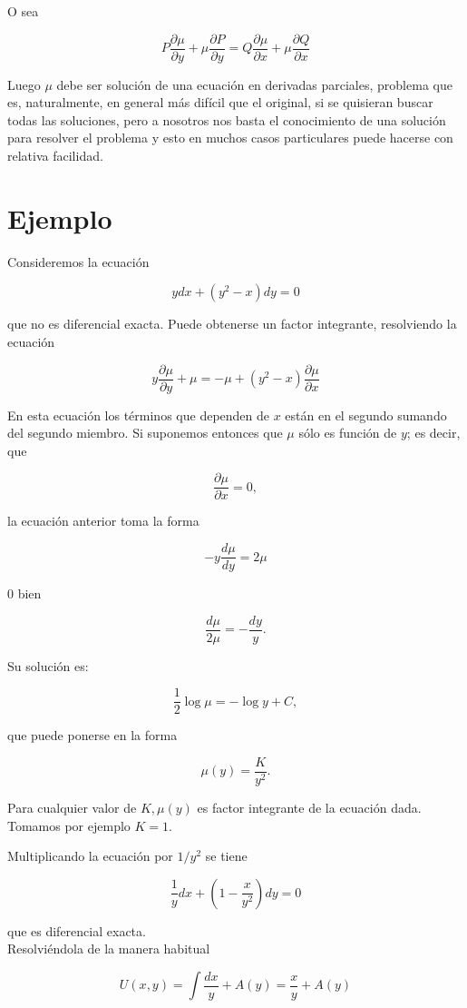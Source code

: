 \documentclass[10pt]{article}
\theoremstyle{plain}
\theoremstyle{definition}
\theoremstyle{remark}
\begin{document}
O sea

$$
P \frac{\partial \mu}{\partial y}+\mu \frac{\partial P}{\partial y}=Q \frac{\partial \mu}{\partial x}+\mu \frac{\partial Q}{\partial x}
$$

Luego $\mu$ debe ser solución de una ecuación en derivadas parciales, problema que es, naturalmente, en general más difícil que el original, si se quisieran buscar todas las soluciones, pero a nosotros nos basta el conocimiento de una solución para resolver el problema y esto en muchos casos particulares puede hacerse con relativa facilidad.

\section*{Ejemplo}
Consideremos la ecuación

$$
y d x+\left(y^{2}-x\right) d y=0
$$

que no es diferencial exacta. Puede obtenerse un factor integrante, resolviendo la ecuación

$$
y \frac{\partial \mu}{\partial y}+\mu=-\mu+\left(y^{2}-x\right) \frac{\partial \mu}{\partial x}
$$

En esta ecuación los términos que dependen de $x$ están en el segundo sumando del segundo miembro. Si suponemos entonces que $\mu$ sólo es función de $y$; es decir, que

$$
\frac{\partial \mu}{\partial x}=0,
$$

la ecuación anterior toma la forma

$$
-y \frac{d \mu}{d y}=2 \mu
$$

0 bien

$$
\frac{d \mu}{2 \mu}=-\frac{d y}{y} .
$$

Su solución es:

$$
\frac{1}{2} \log \mu=-\log y+C,
$$

que puede ponerse en la forma

$$
\mu(y)=\frac{K}{y^{2}} .
$$

Para cualquier valor de $K, \mu(y)$ es factor integrante de la ecuación dada. Tomamos por ejemplo $K=1$.

Multiplicando la ecuación por $1 / y^{2}$ se tiene

$$
\frac{1}{y} d x+\left(1-\frac{x}{y^{2}}\right) d y=0
$$

que es diferencial exacta.\\
Resolviéndola de la manera habitual

$$
U(x, y)=\int \frac{d x}{y}+A(y)=\frac{x}{y}+A(y)
$$
\end{document}
